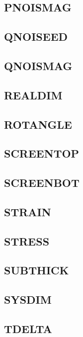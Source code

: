 \documentclass{article}
\begin{document}
\subsection{PNOISMAG }


\subsection{QNOISEED }

\subsection{QNOISMAG }

\subsection{REALDIM  }

\subsection{ROTANGLE }

\subsection{SCREENTOP}

\subsection{SCREENBOT}

\subsection{STRAIN   }

\subsection{STRESS   }

\subsection{SUBTHICK }

\subsection{SYSDIM   }

\subsection{TDELTA   }
\end{document}
